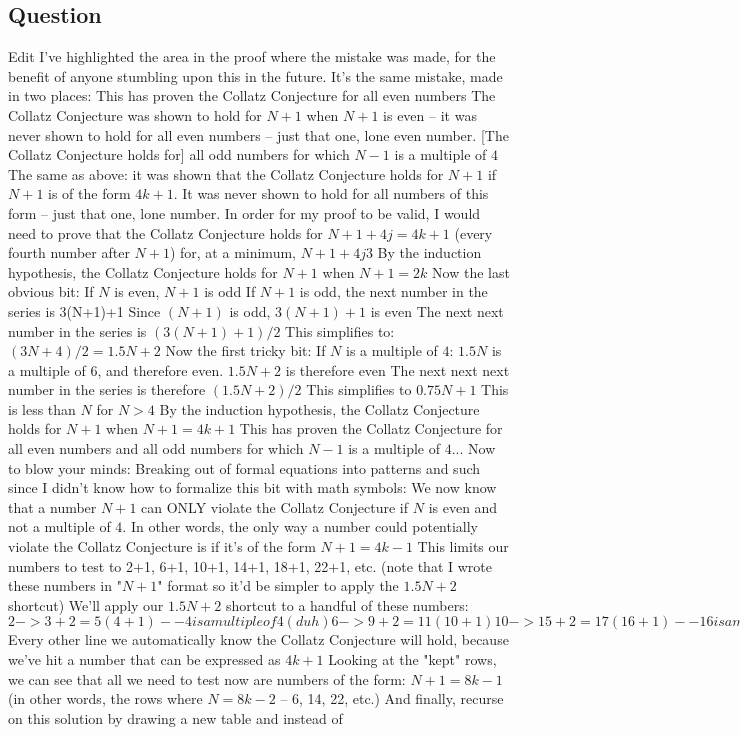 \documentclass{article}
\begin{document}
\subsection*{Question}
Edit I've highlighted the area in the proof where the mistake was made, for the benefit of anyone stumbling upon this in the future. It's the same mistake, made in two places: This has proven the Collatz Conjecture for all even numbers The Collatz Conjecture was shown to hold for $N+1$ when $N+1$ is even -- it was never shown to hold for all even numbers -- just that one, lone even number. [The Collatz Conjecture holds for] all odd numbers for which $N-1$ is a multiple of $4$ The same as above: it was shown that the Collatz Conjecture holds for $N+1$ if $N+1$ is of the form $4k+1$. It was never shown to hold for all numbers of this form -- just that one, lone number. In order for my proof to be valid, I would need to prove that the Collatz Conjecture holds for $N+1+4j = 4k+1$ (every fourth number after $N+1$) for, at a minimum, $N+1+4j  3$ By the induction hypothesis, the Collatz Conjecture holds for $N+1$ when $N+1 = 2k$ Now the last obvious bit: If $N$ is even, $N+1$ is odd If $N+1$ is odd, the next number in the series is 3(N+1)+1 Since $(N+1)$ is odd, $3(N+1)+1$ is even The next next number in the series is $(3(N+1)+1)/2$ This simplifies to: $(3N + 4)/2 = 1.5N + 2$ Now the first tricky bit: If $N$ is a multiple of $4$: $1.5N$ is a multiple of $6$, and therefore even. $1.5N + 2$ is therefore even The next next next number in the series is therefore $(1.5N+2)/2$ This simplifies to $0.75N + 1$ This is less than $N$ for $N > 4$ By the induction hypothesis, the Collatz Conjecture holds for $N+1$ when $N+1 = 4k + 1$ This has proven the Collatz Conjecture for all even numbers and all odd numbers for which $N-1$ is a multiple of $4$... Now to blow your minds: Breaking out of formal equations into patterns and such since I didn't know how to formalize this bit with math symbols: We now know that a number $N+1$ can ONLY violate the Collatz Conjecture if $N$ is even and not a multiple of $4$. In other words, the only way a number could potentially violate the Collatz Conjecture is if it's of the form $N+1 = 4k - 1$ This limits our numbers to test to 2+1, 6+1, 10+1, 14+1, 18+1, 22+1, etc. (note that I wrote these numbers in "$N+1$" format so it'd be simpler to apply the $1.5N+2$ shortcut) We'll apply our $1.5N + 2$ shortcut to a handful of these numbers: $2 -> 3+2 = 5 (4 +1) -- 4 is a multiple of 4 (duh) 6 -> 9+2 = 11 (10+1) 10 -> 15+2 = 17 (16+1) -- 16 is a multiple of 4 14 -> 21+2 = 23 (22+1) 18 -> 27+2 = 29 (28+1) -- 28 is a multiple of 4 22 -> 33+2 = 35 (34+1) 26 -> 39+2 = 41 (40+1) -- 40 is a multiple of 4 30 -> 45+2 = 47 (46+1) 34 -> 51+2 = 53 (52+1) -- 52 is a multiple of 4 38 -> 57+2 = 59 (58+1) 42 -> 63+2 = 65 (64+1) -- 64 is a multiple of 4 46 -> 69+2 = 71 (70+1) $ Every other line we automatically know the Collatz Conjecture will hold, because we've hit a number that can be expressed as $4k+1$ Looking at the "kept" rows, we can see that all we need to test now are numbers of the form: $N+1 = 8k - 1$ (in other words, the rows where $N = 8k - 2$ -- 6, 14, 22, etc.) And finally, recurse on this solution by drawing a new table and instead of 
\end{document}
